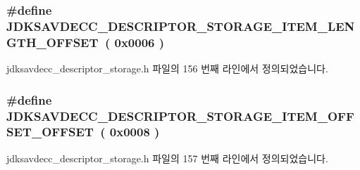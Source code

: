 \subsubsection[{\texorpdfstring{J\+D\+K\+S\+A\+V\+D\+E\+C\+C\+\_\+\+D\+E\+S\+C\+R\+I\+P\+T\+O\+R\+\_\+\+S\+T\+O\+R\+A\+G\+E\+\_\+\+I\+T\+E\+M\+\_\+\+L\+E\+N\+G\+T\+H\+\_\+\+O\+F\+F\+S\+ET}{JDKSAVDECC_DESCRIPTOR_STORAGE_ITEM_LENGTH_OFFSET}}]{\setlength{\rightskip}{0pt plus 5cm}\#define J\+D\+K\+S\+A\+V\+D\+E\+C\+C\+\_\+\+D\+E\+S\+C\+R\+I\+P\+T\+O\+R\+\_\+\+S\+T\+O\+R\+A\+G\+E\+\_\+\+I\+T\+E\+M\+\_\+\+L\+E\+N\+G\+T\+H\+\_\+\+O\+F\+F\+S\+ET~( 0x0006 )}\hypertarget{group__descriptor__storage__item_ga0af0a97779ffef38b1266e5443eef4e5}{}\label{group__descriptor__storage__item_ga0af0a97779ffef38b1266e5443eef4e5}


jdksavdecc\+\_\+descriptor\+\_\+storage.\+h 파일의 156 번째 라인에서 정의되었습니다.

\subsubsection[{\texorpdfstring{J\+D\+K\+S\+A\+V\+D\+E\+C\+C\+\_\+\+D\+E\+S\+C\+R\+I\+P\+T\+O\+R\+\_\+\+S\+T\+O\+R\+A\+G\+E\+\_\+\+I\+T\+E\+M\+\_\+\+O\+F\+F\+S\+E\+T\+\_\+\+O\+F\+F\+S\+ET}{JDKSAVDECC_DESCRIPTOR_STORAGE_ITEM_OFFSET_OFFSET}}]{\setlength{\rightskip}{0pt plus 5cm}\#define J\+D\+K\+S\+A\+V\+D\+E\+C\+C\+\_\+\+D\+E\+S\+C\+R\+I\+P\+T\+O\+R\+\_\+\+S\+T\+O\+R\+A\+G\+E\+\_\+\+I\+T\+E\+M\+\_\+\+O\+F\+F\+S\+E\+T\+\_\+\+O\+F\+F\+S\+ET~( 0x0008 )}\hypertarget{group__descriptor__storage__item_ga000aff4bba560ff201846087f2a3744c}{}\label{group__descriptor__storage__item_ga000aff4bba560ff201846087f2a3744c}


jdksavdecc\+\_\+descriptor\+\_\+storage.\+h 파일의 157 번째 라인에서 정의되었습니다.



